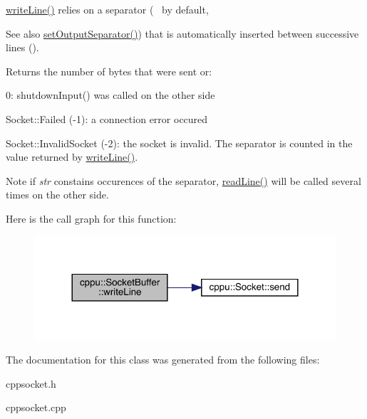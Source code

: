 \mbox{\hyperlink{classcppu_1_1_socket_buffer_a92ae0351aaee8719d34e8c4618495d59}{write\+Line()}} relies on a separator (~\newline
 by default, \begin{DoxySeeAlso}{See also}
\mbox{\hyperlink{classcppu_1_1_socket_buffer_a0e5e6a9ce3bda28b65c559c8b3c91b0f}{set\+Output\+Separator()}}) that is automatically inserted between successive lines ().
\end{DoxySeeAlso}
\begin{DoxyReturn}{Returns}
the number of bytes that were sent or\+:
\begin{DoxyItemize}
\item 0\+: shutdown\+Input() was called on the other side
\item Socket\+::\+Failed (-\/1)\+: a connection error occured
\item Socket\+::\+Invalid\+Socket (-\/2)\+: the socket is invalid. The separator is counted in the value returned by \mbox{\hyperlink{classcppu_1_1_socket_buffer_a92ae0351aaee8719d34e8c4618495d59}{write\+Line()}}.
\end{DoxyItemize}
\end{DoxyReturn}
\begin{DoxyNote}{Note}
if {\itshape str} constains occurences of the separator, \mbox{\hyperlink{classcppu_1_1_socket_buffer_a222769d3776b9cbd3a727ee1f0e60358}{read\+Line()}} will be called several times on the other side. 
\end{DoxyNote}
Here is the call graph for this function\+:
\nopagebreak
\begin{figure}[H]
\begin{center}
\leavevmode
\includegraphics[width=317pt]{classcppu_1_1_socket_buffer_a92ae0351aaee8719d34e8c4618495d59_cgraph}
\end{center}
\end{figure}


The documentation for this class was generated from the following files\+:\begin{DoxyCompactItemize}
\item 
cppsocket.\+h\item 
cppsocket.\+cpp\end{DoxyCompactItemize}
